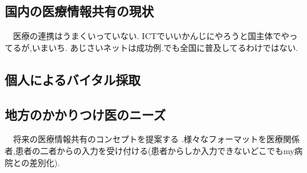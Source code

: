 \subsection{国内の医療情報共有の現状}
　医療の連携はうまくいっていない.
  ICTでいいかんじにやろうと国主体でやってるが,いまいち.
  あじさいネットは成功例.でも全国に普及してるわけではない.\cite{bibi3}

\subsection{個人によるバイタル採取}

\subsection{地方のかかりつけ医のニーズ}
　将来の医療情報共有のコンセプトを提案する .様々なフォーマットを医療関係者,患者の二者からの入力を受け付ける(患者からしか入力できないどこでもmy病院との差別化).
